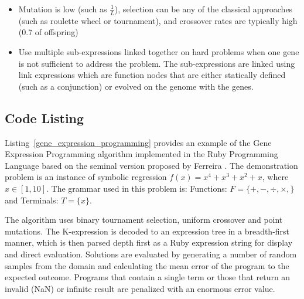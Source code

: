 \begin{itemize}
	\item Mutation is low (such as $\frac{1}{L}$), selection can be any of the classical approaches (such as roulette wheel or tournament), and crossover rates are typically high (0.7 of offspring)
	\item Use multiple sub-expressions linked together on hard problems when one gene is not sufficient to address the problem. The sub-expressions are linked using link expressions which are function nodes that are either statically defined (such as a conjunction) or evolved on the genome with the genes.
\end{itemize}

\subsection{Code Listing}
Listing~\ref{gene_expression_programming} provides an example of the Gene Expression Programming algorithm implemented in the Ruby Programming Language based on the seminal version proposed by Ferreira \cite{Ferreira2001}.
The demonstration problem is an instance of symbolic regression $f(x)=x^4+x^3+x^2+x$, where $x\in[1,10]$. The grammar used in this problem is: Functions: $F=\{+,-,\div,\times,\}$ and Terminals: $T=\{x\}$.

The algorithm uses binary tournament selection, uniform crossover and point mutations. The K-expression is decoded to an expression tree in a breadth-first manner, which is then parsed depth first as a Ruby expression string for display and direct evaluation.
Solutions are evaluated by generating a number of random samples from the domain and calculating the mean error of the program to the expected outcome. Programs that contain a single term or those that return an invalid (NaN) or infinite result are penalized with an enormous error value.

